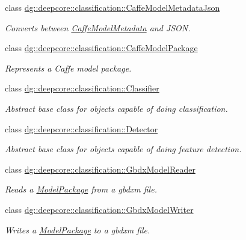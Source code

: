 \begin{DoxyCompactItemize}
class \hyperlink{classdg_1_1deepcore_1_1classification_1_1_caffe_model_metadata_json}{dg\+::deepcore\+::classification\+::\+Caffe\+Model\+Metadata\+Json}
\begin{DoxyCompactList}\small\item\em Converts between \hyperlink{structdg_1_1deepcore_1_1classification_1_1_caffe_model_metadata}{Caffe\+Model\+Metadata} and J\+S\+ON. \end{DoxyCompactList}\item 
class \hyperlink{classdg_1_1deepcore_1_1classification_1_1_caffe_model_package}{dg\+::deepcore\+::classification\+::\+Caffe\+Model\+Package}
\begin{DoxyCompactList}\small\item\em Represents a Caffe model package. \end{DoxyCompactList}\item 
class \hyperlink{classdg_1_1deepcore_1_1classification_1_1_classifier}{dg\+::deepcore\+::classification\+::\+Classifier}
\begin{DoxyCompactList}\small\item\em Abstract base class for objects capable of doing classification. \end{DoxyCompactList}\item 
class \hyperlink{classdg_1_1deepcore_1_1classification_1_1_detector}{dg\+::deepcore\+::classification\+::\+Detector}
\begin{DoxyCompactList}\small\item\em Abstract base class for objects capable of doing feature detection. \end{DoxyCompactList}\item 
class \hyperlink{classdg_1_1deepcore_1_1classification_1_1_gbdx_model_reader}{dg\+::deepcore\+::classification\+::\+Gbdx\+Model\+Reader}
\begin{DoxyCompactList}\small\item\em Reads a \hyperlink{classdg_1_1deepcore_1_1classification_1_1_model_package}{Model\+Package} from a gbdxm file. \end{DoxyCompactList}\item 
class \hyperlink{classdg_1_1deepcore_1_1classification_1_1_gbdx_model_writer}{dg\+::deepcore\+::classification\+::\+Gbdx\+Model\+Writer}
\begin{DoxyCompactList}\small\item\em Writes a \hyperlink{classdg_1_1deepcore_1_1classification_1_1_model_package}{Model\+Package} to a gbdxm file. \end{DoxyCompactList}\item 

\end{DoxyCompactItemize}
